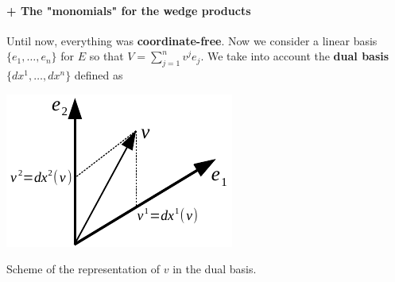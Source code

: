 \documentclass[../main.tex]{subfiles}
\begin{document}
\paragraph{+ The "monomials" for the wedge products} Until now, everything was \textbf{coordinate-free}. Now we consider a linear basis $\{e_1,\dots,e_n\}$ for $E$ so that $V=\sum_{j=1}^{n}v^j e_j$. We take into account the \textbf{dual basis} $\{dx^1,\dots,dx^n\}$ defined as

\begin{marginfigure}[8mm]
	\includegraphics[width=1.1\linewidth]{images/dual_basis.pdf}
	\caption{Scheme of the representation of $v$ in the dual basis.}
\end{marginfigure}
\end{document}
